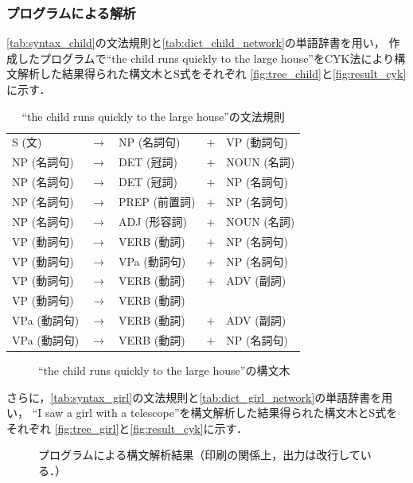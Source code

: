\documentclass[uplatex, dvipdfmx, a4paper, twocolumn]{jsarticle}
\begin{document}
      \subsubsection{プログラムによる解析}
      \autoref{tab:syntax_child}の文法規則と\autoref{tab:dict_child_network}の単語辞書を用い，
      作成したプログラムで``the child runs quickly to the large house''をCYK法により構文解析した結果得られた構文木とS式をそれぞれ
      \autoref{fig:tree_child}と\autoref{fig:result_cyk}に示す．
      \begin{table}[htb]
        \centering
        \caption{``the child runs quickly to the large house''の文法規則}
        \label{tab:syntax_child}
        \begin{tabular}{l c l c l} \hline
          S (文) & $\to$ & NP (名詞句) & $+$ & VP (動詞句) \\
          NP (名詞句) & $\to$ & DET (冠詞) & $+$ & NOUN (名詞) \\
          NP (名詞句) & $\to$ & DET (冠詞) & $+$ & NP (名詞句) \\
          NP (名詞句) & $\to$ & PREP (前置詞) & $+$ & NP (名詞句) \\
          NP (名詞句) & $\to$ & ADJ (形容詞) & $+$ & NOUN (名詞) \\
          VP (動詞句) & $\to$ & VERB (動詞) & $+$ & NP (名詞句) \\
          VP (動詞句) & $\to$ & VPa (動詞句) & $+$ & NP (名詞句) \\
          VP (動詞句) & $\to$ & VERB (動詞) & $+$ & ADV (副詞) \\
          VP (動詞句) & $\to$ & VERB (動詞) & & \\
          VPa (動詞句) & $\to$ & VERB (動詞) & $+$ & ADV (副詞) \\
          VPa (動詞句) & $\to$ & VERB (動詞) & $+$ & NP (名詞句) \\ \hline
        \end{tabular}
      \end{table}
      \begin{figure}[htpb]
        \centering
        \resizebox{0.95\linewidth}{!}{
          
        }
        \caption{``the child runs quickly to the large house''の構文木}
        \label{fig:tree_child}      
      \end{figure}

      さらに，\autoref{tab:syntax_girl}の文法規則と\autoref{tab:dict_girl_network}の単語辞書を用い，
      ``I saw a girl with a telescope''を構文解析した結果得られた構文木とS式をそれぞれ
      \autoref{fig:tree_girl}と\autoref{fig:result_cyk}に示す．
      \begin{figure}[htpb]
        \centering
        \caption{プログラムによる構文解析結果（印刷の関係上，出力は改行している．）}
        \label{fig:result_cyk}
      \end{figure}
\end{document}

